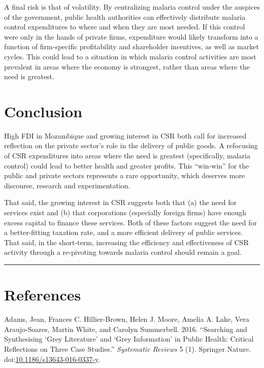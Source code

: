 \documentclass[]{article}
\begin{document}
A final risk is that of volatility. By centralizing malaria control
under the auspices of the government, public health authorities can
effectively distribute malaria control expenditures to where and when
they are most needed. If this control were only in the hands of private
firms, expenditure would likely transform into a function of
firm-specific profitability and shareholder incentives, as well as
market cycles. This could lead to a situation in which malaria control
activities are most prevalent in areas where the economy is strongest,
rather than areas where the need is greatest.

\section{Conclusion}\label{conclusion}

High FDI in Mozambique and growing interest in CSR both call for
increased reflection on the private sector's role in the delivery of
public goods. A refocusing of CSR expenditures into areas where the need
is greatest (specifically, malaria control) could lead to better health
and greater profits. This ``win-win'' for the public and private sectors
represents a rare opportunity, which deserves more discourse, research
and experimentation.

That said, the growing interest in CSR suggests both that (a) the need
for services exist and (b) that corporations (especially foreign firms)
have enough excess capital to finance these services. Both of these
factors suggest the need for a better-fitting taxation rate, and a more
efficient delivery of public services. That said, in the short-term,
increasing the efficiency and effectiveness of CSR activity through a
re-pivoting towards malaria control should remain a goal.

\begin{center}\rule{0.5\linewidth}{\linethickness}\end{center}

\section*{References}\label{references}

\hypertarget{refs}{}
\hypertarget{ref-Adams2016}{}
Adams, Jean, Frances C. Hillier-Brown, Helen J. Moore, Amelia A. Lake,
Vera Araujo-Soares, Martin White, and Carolyn Summerbell. 2016.
``Searching and Synthesising `Grey Literature' and `Grey Information' in
Public Health: Critical Reflections on Three Case Studies.''
\emph{Systematic Reviews} 5 (1). Springer Nature.
doi:\href{https://doi.org/10.1186/s13643-016-0337-y}{10.1186/s13643-016-0337-y}.
\end{document}

